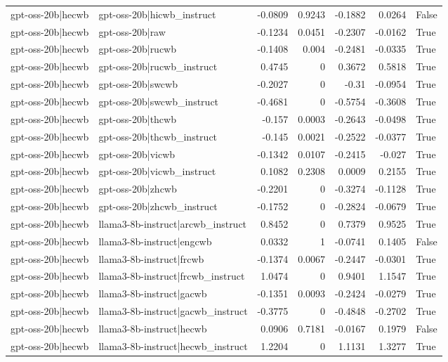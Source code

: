 \begin{table}
\begin{tabular}{l l r r r r l}
gpt-oss-20b|hecwb & gpt-oss-20b|hicwb_instruct & -0.0809 & 0.9243 & -0.1882 & 0.0264 & False \\
gpt-oss-20b|hecwb & gpt-oss-20b|raw & -0.1234 & 0.0451 & -0.2307 & -0.0162 & True \\
gpt-oss-20b|hecwb & gpt-oss-20b|rucwb & -0.1408 & 0.004 & -0.2481 & -0.0335 & True \\
gpt-oss-20b|hecwb & gpt-oss-20b|rucwb_instruct & 0.4745 & 0 & 0.3672 & 0.5818 & True \\
gpt-oss-20b|hecwb & gpt-oss-20b|swcwb & -0.2027 & 0 & -0.31 & -0.0954 & True \\
gpt-oss-20b|hecwb & gpt-oss-20b|swcwb_instruct & -0.4681 & 0 & -0.5754 & -0.3608 & True \\
gpt-oss-20b|hecwb & gpt-oss-20b|thcwb & -0.157 & 0.0003 & -0.2643 & -0.0498 & True \\
gpt-oss-20b|hecwb & gpt-oss-20b|thcwb_instruct & -0.145 & 0.0021 & -0.2522 & -0.0377 & True \\
gpt-oss-20b|hecwb & gpt-oss-20b|vicwb & -0.1342 & 0.0107 & -0.2415 & -0.027 & True \\
gpt-oss-20b|hecwb & gpt-oss-20b|vicwb_instruct & 0.1082 & 0.2308 & 0.0009 & 0.2155 & True \\
gpt-oss-20b|hecwb & gpt-oss-20b|zhcwb & -0.2201 & 0 & -0.3274 & -0.1128 & True \\
gpt-oss-20b|hecwb & gpt-oss-20b|zhcwb_instruct & -0.1752 & 0 & -0.2824 & -0.0679 & True \\
gpt-oss-20b|hecwb & llama3-8b-instruct|arcwb_instruct & 0.8452 & 0 & 0.7379 & 0.9525 & True \\
gpt-oss-20b|hecwb & llama3-8b-instruct|engcwb & 0.0332 & 1 & -0.0741 & 0.1405 & False \\
gpt-oss-20b|hecwb & llama3-8b-instruct|frcwb & -0.1374 & 0.0067 & -0.2447 & -0.0301 & True \\
gpt-oss-20b|hecwb & llama3-8b-instruct|frcwb_instruct & 1.0474 & 0 & 0.9401 & 1.1547 & True \\
gpt-oss-20b|hecwb & llama3-8b-instruct|gacwb & -0.1351 & 0.0093 & -0.2424 & -0.0279 & True \\
gpt-oss-20b|hecwb & llama3-8b-instruct|gacwb_instruct & -0.3775 & 0 & -0.4848 & -0.2702 & True \\
gpt-oss-20b|hecwb & llama3-8b-instruct|hecwb & 0.0906 & 0.7181 & -0.0167 & 0.1979 & False \\
gpt-oss-20b|hecwb & llama3-8b-instruct|hecwb_instruct & 1.2204 & 0 & 1.1131 & 1.3277 & True \\

\end{tabular}
\end{table}
